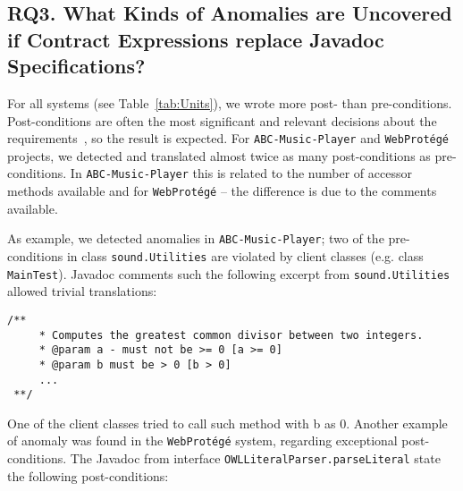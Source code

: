 \subsection{RQ3. What Kinds of Anomalies are Uncovered if Contract Expressions replace Javadoc Specifications?}
\label{rq3}


For all systems (see Table~\ref{tab:Units}), we
wrote more post- than pre-conditions. 
Post-conditions are often the most significant and relevant decisions about the requirements~\cite{Rosemblum,sac2017}, so the result is expected. 
For \texttt{ABC-Music-Player} and
\texttt{WebProt\'{e}g\'{e}} projects, we detected and translated almost twice as many post-conditions as pre-conditions.
In \texttt{ABC-Music-Player} this is related to the number of accessor methods available and for \texttt{WebProt\'{e}g\'{e}} -- the difference is due to the comments available.





As example, we detected anomalies in \texttt{ABC-Mu\-sic-Player}; two of the pre-conditions in class \texttt{sound.Utilities} are violated by client classes (e.g. class \texttt{MainTest}). Javadoc comments such the following excerpt from \texttt{sound.Utilities} allowed trivial translations:
\begin{lstlisting}[basicstyle=\footnotesize\ttfamily,name=figxpi, frame=lines, mathescape=true]
 /**
     * Computes the greatest common divisor between two integers.
     * @param a - must not be >= 0 [a >= 0]
     * @param b must be > 0 [b > 0]
     ...
 **/  
\end{lstlisting}

One of the client classes tried to call such method with b as $0$. Another example of anomaly was found in the \texttt{WebProt\'{e}g\'{e}} system, regarding exceptional post-conditions. 
The Javadoc from interface \texttt{OWLLiteralParser.parseLiteral} state the following post-conditions:


